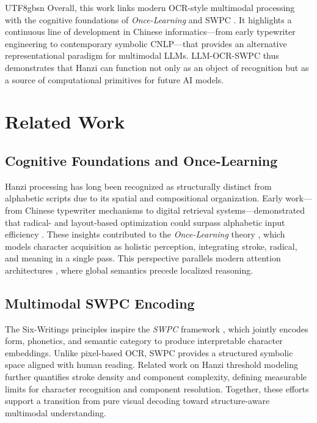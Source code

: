 \documentclass[conference]{IEEEtran}
\begin{document}
\begin{CJK*}{UTF8}{gbsn}
Overall, this work links modern OCR-style multimodal processing with the cognitive foundations of \emph{Once-Learning} and SWPC \cite{weigang1999once,weigang2024six}. It highlights a continuous line of development in Chinese informatics—from early typewriter engineering to contemporary symbolic CNLP—that provides an alternative representational paradigm for multimodal LLMs. LLM-OCR-SWPC thus demonstrates that Hanzi can function not only as an object of recognition but as a source of computational primitives for future AI models.

\section{Related Work}
\label{sec:relatedwork}

\subsection{Cognitive Foundations and Once-Learning}

Hanzi processing has long been recognized as structurally distinct from alphabetic scripts due to its spatial and compositional organization. Early work—from Chinese typewriter mechanisms to digital retrieval systems—demonstrated that radical- and layout-based optimization could surpass alphabetic input efficiency \cite{mullaney2017chinese,weigang2022typewriter}. These insights contributed to the \textit{Once-Learning} theory \cite{weigang1999study,weigang2022hol,althoff2022once}, which models character acquisition as holistic perception, integrating stroke, radical, and meaning in a single pass. This perspective parallels modern attention architectures \cite{vaswani2017attention}, where global semantics precede localized reasoning.

\subsection{Multimodal SWPC Encoding}

The Six-Writings principles inspire the \textit{SWPC} framework \cite{weigang2024six}, which jointly encodes form, phonetics, and semantic category to produce interpretable character embeddings. Unlike pixel-based OCR, SWPC provides a structured symbolic space aligned with human reading. Related work on Hanzi threshold modeling \cite{weigang2025threshold} further quantifies stroke density and component complexity, defining measurable limits for character recognition and component resolution. Together, these efforts support a transition from pure visual decoding toward structure-aware multimodal understanding.


\end{CJK*}
\end{document}
